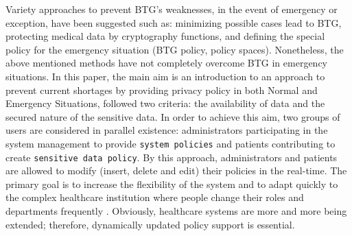 Variety approaches to prevent BTG's weaknesses, in the event of emergency or exception, have been suggested such as: minimizing possible cases lead to BTG, 
protecting medical data by cryptography functions, and defining the special policy for the emergency situation (BTG policy, policy spaces). 
Nonetheless, the above mentioned methods have not completely overcome BTG in emergency situations. 
In this paper, the main aim is an introduction to an approach to prevent current shortages by providing privacy policy in both Normal and Emergency Situations, followed two criteria: the availability of data and the secured nature of the sensitive data.
In order to achieve this aim, two groups of users are considered in parallel existence: administrators participating in the system management to provide \texttt{system policies} and patients contributing to create \texttt{sensitive data policy}.
By this approach, administrators and patients are allowed to modify (insert, delete and edit) their policies in the real-time.
The primary goal is to increase the flexibility of the system and to adapt quickly to the complex healthcare institution where people change their roles and departments frequently \cite{ferreira2006break}.
Obviously, healthcare systems are more and more being extended; therefore, dynamically updated policy support is essential.
